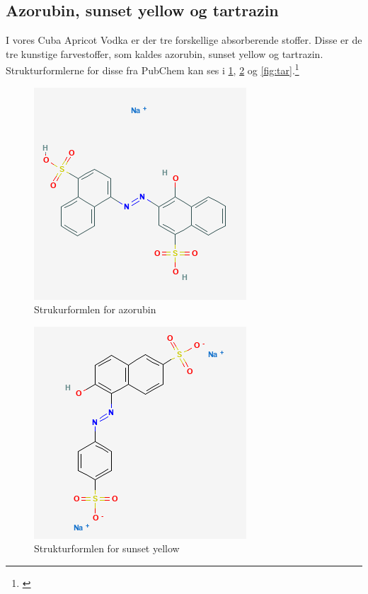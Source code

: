 \documentclass[11pt]{article}
\theoremstyle{definition}
\begin{document}
\subsection{Azorubin, sunset yellow og tartrazin}
I vores Cuba Apricot Vodka er der tre forskellige absorberende stoffer.
Disse er de tre kunstige farvestoffer, som kaldes azorubin, sunset yellow og tartrazin.
Strukturformlerne for disse fra PubChem kan ses i \cref{fig:azo}, \cref{fig:sun} og \cref{fig:tar}.\footnote{\cite{PubChem2023,PubChem2023a,PubChem2023b}}
\begin{figure}[H]
\begin{center}
  \includegraphics[scale=1]{azorubin.png}
\end{center}
\caption{Strukurformlen for azorubin}
\label{fig:azo}
\end{figure}

\begin{figure}[H]
\begin{center}
  \includegraphics[scale=1]{sunset.png}
\end{center}
\caption{Strukturformlen for sunset yellow}
\label{fig:sun}
\end{figure}
\end{document}
